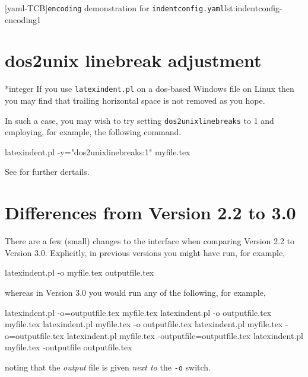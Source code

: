   [yaml-TCB]{\texttt{encoding} demonstration for \texttt{indentconfig.yaml}}{lst:indentconfig-encoding1}

 \section{dos2unix linebreak adjustment}

 *{integer}
  If you use \texttt{latexindent.pl} on a dos-based Windows file on Linux
   then you may find that trailing horizontal
  space is not removed as you hope.

  In such a case, you may wish to try setting \texttt{dos2unixlinebreaks} to 1 and
  employing, for example, the following command.

  \begin{commandshell}
latexindent.pl -y="dos2unixlinebreaks:1" myfile.tex
\end{commandshell}

  See \cite{bersbersbers} for further dertails.

 \section{Differences from Version 2.2 to 3.0}\label{app:differences}
  There are a few (small) changes to the interface when comparing Version 2.2 to Version
  3.0. Explicitly, in previous versions you might have run, for example,

  \begin{commandshell}
latexindent.pl -o myfile.tex outputfile.tex
\end{commandshell}

  whereas in Version 3.0 you would run any of the following, for example,

  \begin{commandshell}
latexindent.pl -o=outputfile.tex myfile.tex
latexindent.pl -o outputfile.tex myfile.tex
latexindent.pl myfile.tex -o outputfile.tex 
latexindent.pl myfile.tex -o=outputfile.tex 
latexindent.pl myfile.tex -outputfile=outputfile.tex 
latexindent.pl myfile.tex -outputfile outputfile.tex 
\end{commandshell}

  noting that the \emph{output} file is given \emph{next to} the \texttt{-o} switch.

